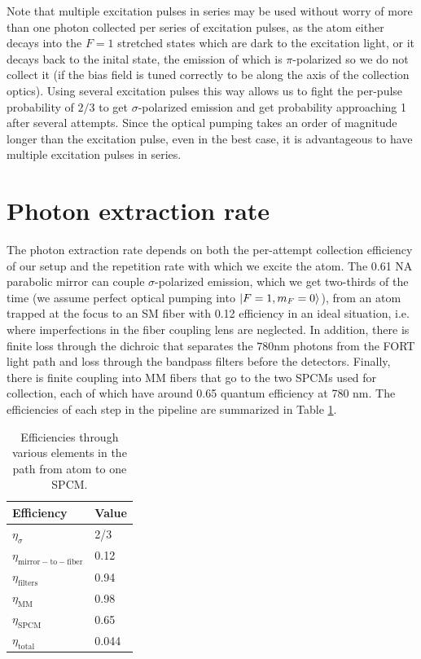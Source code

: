 Note that multiple excitation pulses in series may be used without worry of more than one photon collected per series of excitation pulses, as the atom either decays into the $F=1$ stretched states which are dark to the excitation light, or it decays back to the inital state, the emission of which is $\pi$-polarized so we do not collect it (if the bias field is tuned correctly to be along the axis of the collection optics). Using several excitation pulses this way allows us to fight the per-pulse probability of $2/3$ to get $\sigma$-polarized emission and get probability approaching 1 after several attempts. Since the optical pumping takes an order of magnitude longer than the excitation pulse, even in the best case, it is advantageous to have multiple excitation pulses in series. 

\section{Photon extraction rate}
The photon extraction rate depends on both the per-attempt collection efficiency of our setup and the repetition rate with which we excite the atom. The 0.61 NA parabolic mirror can couple $\sigma$-polarized emission, which we get two-thirds of the time (we assume perfect optical pumping into $\ket{F=1,m_F=0}$), from an atom trapped at the focus to an SM fiber with 0.12 efficiency in an ideal situation, i.e. where imperfections in the fiber coupling lens are neglected. In addition, there is finite loss through the dichroic that separates the $780 $nm photons from the FORT light path and loss through the bandpass filters before the detectors. Finally, there is finite coupling into MM fibers that go to the two SPCMs used for collection, each of which have around 0.65 quantum efficiency at 780 nm. The efficiencies of each step in the pipeline are summarized in Table \ref{table:collection_efficiency}.

\begin{table}[!h]
    \centering
    \begin{tabular}{ | m{2.2cm}| m{1cm} | }
        \hline
        Efficiency & Value \\
        \hline
        $\eta_{\sigma}$& 2/3 \\ 
        \hline
        $\eta_{\mathrm{mirror-to-fiber}} $& 0.12 \\
        \hline
        $\eta_{\mathrm{filters}} $& 0.94\footnotemark{} \\
        \hline
        $\eta_{\mathrm{MM}} $& 0.98 \\
        \hline
        $\eta_{\mathrm{SPCM}} $& 0.65 \\
        \hline
        $\eta_{\mathrm{total}} $& 0.044 \\
        \hline
    \end{tabular}
    \caption{Efficiencies through various elements in the path from atom to one SPCM.}
    \label{table:collection_efficiency}
\end{table}


